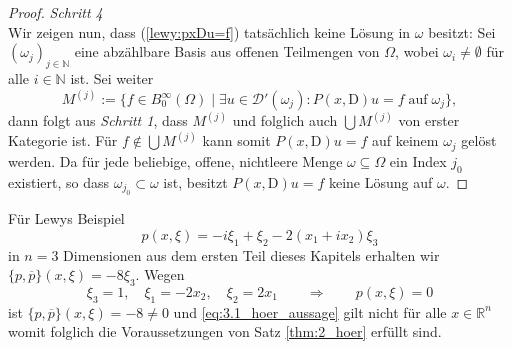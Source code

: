 \begin{proof}
\textit{Schritt 4}\\
Wir zeigen nun, dass (\ref{lewy:pxDu=f}) tatsächlich keine Lösung in $\omega$ besitzt: Sei $(\omega_j)_{j\in\mathbb{N}}$ eine abzählbare Basis aus offenen Teilmengen von $\Omega$, wobei $\omega_i\neq\emptyset$ für alle $i\in\mathbb{N}$ ist. Sei weiter
\begin{equation}
M^{(j)}:=\{f\in B_0^\infty(\Omega)\mid \exists u\in\mathscr{D}'(\omega_j): P(x,\mathrm{D})u=f\;\mathrm{auf\;}\omega_j\},
\end{equation}
dann folgt aus \textit{Schritt 1}, dass $M^{(j)}$ und folglich auch $\bigcup M^{(j)}$ von erster Kategorie ist. Für $f\notin \bigcup M^{(j)}$ kann somit $P(x,\mathrm{D})u=f$ auf keinem $\omega_j$ gelöst werden. Da für jede beliebige, offene, nichtleere Menge $\omega\subseteq\Omega$ ein Index $j_0$ existiert, so dass $\omega_{j_0}\subset\omega$ ist, besitzt $P(x,\mathrm{D})u=f$ keine Lösung auf $\omega$.
\end{proof}

Für Lewys Beispiel 
\begin{equation}
p(x,\xi)=-i\xi_1+\xi_2-2(x_1+ix_2)\xi_3
\end{equation}
in $n=3$ Dimensionen aus dem ersten Teil dieses Kapitels erhalten wir $\{p,\overline{p}\}(x,\xi)=-8\xi_3$. Wegen
\begin{equation}
\xi_3 =1,\quad \xi_1=-2x_2,\quad \xi_2=2x_1\qquad\Rightarrow\qquad p(x,\xi)=0
\end{equation}
ist $\{p,\overline{p}\}(x,\xi)=-8\neq 0$ und \eqref{eq:3.1_hoer_aussage} gilt nicht für alle $x\in\mathbb{R}^n$ womit folglich die Voraussetzungen von Satz \ref{thm:2_hoer} erfüllt sind.